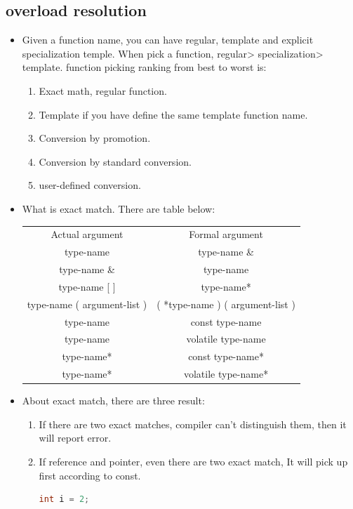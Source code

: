 \documentclass[a4paper,11pt,twoside]{book}
\renewcommand{\hline}{}
\begin{document}
\subsection{overload resolution}
\begin{itemize}
	\item Given a function name, you can have regular, template and explicit specialization temple. When pick a function, regular> specialization> template. function picking ranking from best to worst is:
	\begin{enumerate}
		\item Exact math, regular function.
		\item Template if you have define the same template function name.
		\item Conversion by promotion.
		\item Conversion by standard conversion.
		\item user-defined conversion.
	\end{enumerate}

\item What is exact match. There are table below:

\begin{tabular}{|c|c|}
\hline
Actual argument & Formal argument \\
\hline
type-name & type-name \& \\
\hline
type-name \& & type-name \\ \hline
type-name [ ] &  type-name* \\ \hline
type-name ( argument-list ) & ( *type-name ) ( argument-list ) \\ \hline
type-name  & const type-name \\ \hline
type-name  &  volatile  type-name \\ \hline
type-name*  & const type-name*  \\ \hline
type-name*  & volatile  type-name*  \\  \hline
\end{tabular}

	\item About exact match, there are three result:
	\begin{enumerate}
		\item If there are two exact matches, compiler can't distinguish them, then it will report error.
		
		\item If reference and pointer, even there are two exact match, It will pick up first according to const.
\begin{lstlisting}[frame=single, language=c++]
int i = 2;


\end{lstlisting}
\end{enumerate}
\end{itemize}
\end{document}
